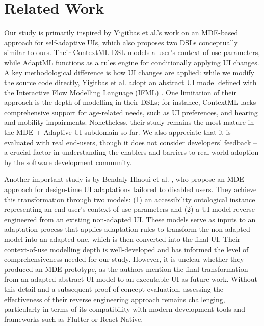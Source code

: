 \section{Related Work}
\label{related work}


Our study is primarily inspired by Yigitbas et al.’s \cite{yigitbas2020} work on an MDE-based approach for self-adaptive UIs, which also proposes two DSLs conceptually similar to ours. Their ContextML DSL models a user's context-of-use parameters, while AdaptML functions as a rules engine for conditionally applying UI changes. A key methodological difference is how UI changes are applied: while we modify the source code directly, Yigitbas et al. \cite{yigitbas2020} adopt an abstract UI model defined with the Interactive Flow Modelling Language (IFML) \cite{brambilla2014}. One limitation of their approach is the depth of modelling in their DSLs; for instance, ContextML lacks comprehensive support for age-related needs, such as UI preferences, and hearing and mobility impairments. Nonetheless, their study remains the most mature in the MDE + Adaptive UI subdomain so far. We also appreciate that it is evaluated with real end-users, though it does not consider developers' feedback -- a crucial factor in understanding the enablers and barriers to real-world adoption by the software development community.

Another important study is by Bendaly Hlaoui et al. \cite{bendaly2018}, who propose an MDE approach for design-time UI adaptations tailored to disabled users. They achieve this transformation through two models: (1) an accessibility ontological instance representing an end user's context-of-use parameters and (2) a UI model reverse-engineered from an existing non-adapted UI. These models serve as inputs to an adaptation process that applies adaptation rules to transform the non-adapted model into an adapted one, which is then converted into the final UI. Their context-of-use modelling depth is well-developed and has informed the level of comprehensiveness needed for our study. However, it is unclear whether they produced an MDE prototype, as the authors mention the final transformation from an adapted abstract UI model to an executable UI as future work. Without this detail and a subsequent proof-of-concept evaluation, assessing the effectiveness of their reverse engineering approach remains challenging, particularly in terms of its compatibility with modern development tools and frameworks such as Flutter or React Native.

